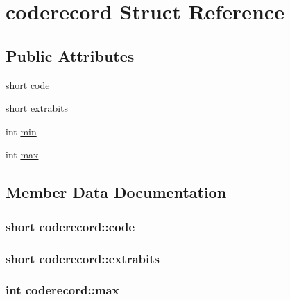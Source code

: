 \hypertarget{structcoderecord}{}\section{coderecord Struct Reference}
\label{structcoderecord}
\subsection*{Public Attributes}
\begin{DoxyCompactItemize}
\item 
short \hyperlink{structcoderecord_ae7512b754341f3da54dbe87c1dc89299}{code}
\item 
short \hyperlink{structcoderecord_a6711213b9de3386b6a7dad09703de597}{extrabits}
\item 
int \hyperlink{structcoderecord_ac5c969af184cce64ed62e83e293863a9}{min}
\item 
int \hyperlink{structcoderecord_a60833b23f7fbb75a23f2e4b6fcf786a2}{max}
\end{DoxyCompactItemize}


\subsection{Member Data Documentation}
\subsubsection[{\texorpdfstring{code}{code}}]{\setlength{\rightskip}{0pt plus 5cm}short coderecord\+::code}\hypertarget{structcoderecord_ae7512b754341f3da54dbe87c1dc89299}{}\label{structcoderecord_ae7512b754341f3da54dbe87c1dc89299}
\subsubsection[{\texorpdfstring{extrabits}{extrabits}}]{\setlength{\rightskip}{0pt plus 5cm}short coderecord\+::extrabits}\hypertarget{structcoderecord_a6711213b9de3386b6a7dad09703de597}{}\label{structcoderecord_a6711213b9de3386b6a7dad09703de597}
\subsubsection[{\texorpdfstring{max}{max}}]{\setlength{\rightskip}{0pt plus 5cm}int coderecord\+::max}\hypertarget{structcoderecord_a60833b23f7fbb75a23f2e4b6fcf786a2}{}\label{structcoderecord_a60833b23f7fbb75a23f2e4b6fcf786a2}
